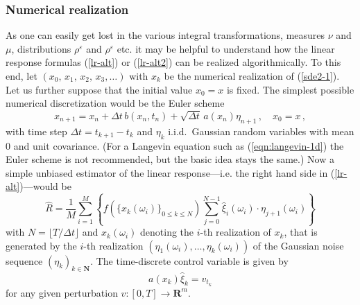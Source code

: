 \documentclass[]{tMPH2e}
\newcommand{\R}{{\mathbf R}}
\newcommand{\N}{{\mathbf N}}
\newcommand{\eps}{\varepsilon}
\begin{document}
\subsubsection*{Numerical realization}

As one can easily get lost in the various integral transformations, measures $\nu$ and $\mu$, distributions $\rho^{\eps}$ and $\rho^{\eps}$ etc. it may be helpful to understand how the linear response formulas (\ref{lr-alt}) or (\ref{lr-alt2}) can be realized algorithmically. To this end, let $(x_0,\,x_{1},\,x_{2},\,x_{3},\ldots)$ with $x_{k}$ be the numerical realization of (\ref{sde2-1}). Let us further suppose that the initial value $x_{0}=x$ is fixed. The simplest possible numerical discretization would be the Euler scheme 
\[
x_{n+1} = x_{n} + \Delta t\, b(x_{n},t_{n}) + \sqrt{\Delta t}\,a(x_{n})\eta_{n+1}\,,\quad x_{0}=x\,, 
\]
with time step $\Delta t=t_{k+1}-t_{k}$ and $\eta_{k}$ i.i.d.~Gaussian random variables with mean 0 and unit covariance. (For a Langevin equation such as (\ref{eqn:langevin-1d}) the Euler scheme is not recommended, but the basic idea stays the same.) Now a simple unbiased estimator of the linear response---i.e. the right hand side in (\ref{lr-alt})---would be 
\begin{equation}\label{lr-est}
\hat{R} = \frac{1}{M}\sum_{i=1}^{M}\left\{f(\{x_{k}(\omega_{i})\}_{0\le k\le N})\sum_{j=0}^{N-1}\hat{\xi}_{i}(\omega_{i})\cdot \eta_{j+1}(\omega_{i})\right\}
\end{equation}
with $N=\lfloor T/\Delta t\rfloor$ and $x_{k}(\omega_{i})$ denoting the $i$-th realization of $x_{k}$, that is generated by the $i$-th realization $(\eta_{1}(\omega_{i}),\ldots,\eta_{k}(\omega_{i}))$ of the Gaussian noise sequence $(\eta_{k})_{k\in\N}$. The time-discrete control variable is given by  
\[
a(x_{k})\hat{\xi}_{k} = v_{t_{k}}
\]
for any given perturbation $v\colon[0,T]\to\R^{m}$. 
\end{document}
